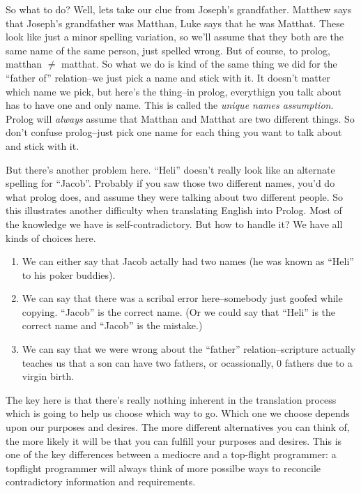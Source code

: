 \documentclass{book}[9pt]
\begin{document}
So what to do?  Well, lets take our clue from Joseph's grandfather.
Matthew says that Joseph's grandfather was Matthan, Luke says that he
was Matthat.  These look like just a minor spelling variation, so
we'll assume that they both are the same name of the same person, just
spelled wrong.  But of course, to prolog, matthan $\neq$ matthat.  So
what we do is kind of the same thing we did for the ``father of''
relation--we just pick a name and stick with it.  It doesn't matter
which name we pick, but here's the thing--in prolog, everythign you
talk about has to have one and only name.  This is called the 
{\em unique names assumption}.  Prolog will {\em always} assume that
Matthan and Matthat are two different things.  So don't confuse
prolog--just pick one name for each thing you want to talk about and
stick with it.  

But there's another problem here.  ``Heli'' doesn't really look like
an alternate spelling for ``Jacob''.  Probably if you saw those two
different names, you'd do what prolog does, and assume they were
talking about two different people.  So this illustrates another
difficulty when translating English into Prolog.   Most of the knowledge
we have is self-contradictory.  But how to handle it?  We have all kinds of choices here.  
\begin{enumerate}
\item We can either say that Jacob actally had two names 
(he was known as ``Heli'' to his poker buddies).
\item We can say that there was a scribal error here--somebody just
  goofed while copying.  ``Jacob'' is the correct name.  (Or we could
  say that ``Heli'' is the correct name and ``Jacob'' is the mistake.)
\item We can say that we were wrong about the ``father''
  relation--scripture actually teaches us that a son can have two
  fathers, or ocassionally, 0 fathers due to a virgin birth.
\end{enumerate}
\noindent The key here is that there's really nothing inherent in the
translation process which is going to help us choose which way to go.
Which one we choose depends upon our purposes and desires.  The more
different alternatives you can think of, the more likely it will be
that you can fulfill your purposes and desires.  This is one of the
key differences between a mediocre and a top-flight programmer: a
topflight programmer will always think of more possilbe ways to
reconcile contradictory information and requirements.
\end{document}
